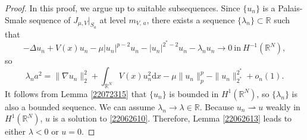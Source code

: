 \documentclass[10pt]{article}
\numberwithin{equation}{section}
\newcommand{\ud}{\mathrm{d}}
\numberwithin{equation}{section}
\begin{document}
\begin{proof}
In this proof, we argue up to suitable subsequences.
Since $\{u_n\}$ is a Palais-Smale sequence of $J_{\mu, V}|_{S_a}$ at level ${m}_{V,\, a}$, there exists a sequence $\{\lambda_n\}\subset \mathbb{R}$ such that
\begin{equation}\label{22071020}
    -\Delta u_n+V(x)u_n-\mu |u_n|^{p-2}u_n-|u_n|^{2^{*}-2}u_n-\lambda_n u_n\rightarrow 0 ~\text{in} ~H^{-1}(\mathbb{R}^N),
\end{equation}
so
\begin{equation}
\lambda_n a^2=\|\nabla u_n\|_2^2+\int_{\mathbb{R}^N} V(x)u_n^2 \ud x-\mu \|u_n\|_p^p-\|u_n\|_{2^*}^{2^*}+o_n(1).
\end{equation}
It follows from Lemma \ref{22072315} that $\{u_n\}$ is bounded in $H^1(\mathbb{R}^N)$, so $\{\lambda_n\}$ is also a bounded sequence. We can assume $\lambda_n\rightarrow \lambda \in \mathbb{R}$. Because $u_n \rightharpoonup u$ weakly in $H^1(\mathbb{R}^N)$, $u$ is a solution to \eqref{22062610}.
Therefore, Lemma \ref{22062613} leads to either $\lambda<0$ or $u=0$. 


\end{proof}
\end{document}
